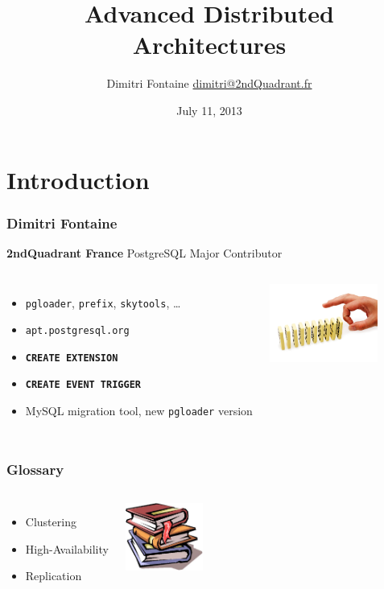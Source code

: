 \documentclass{beamer}
\title{Advanced Distributed Architectures}
\author{Dimitri Fontaine \url{dimitri@2ndQuadrant.fr}}
\date{July 11, 2013}
\begin{document}
\frame{\titlepage}

\section{Introduction}

\begin{frame}[fragile]
  \frametitle{Dimitri Fontaine}

  \begin{center}
    \textbf{2ndQuadrant France}
    \linebreak
    PostgreSQL Major Contributor
  \end{center}
  \vfill

\begin{columns}[c]

  \begin{itemize}
   \item<1-> \texttt{pgloader}, \texttt{prefix}, \texttt{skytools}, …
   \item<1-> \texttt{apt.postgresql.org}
   \item<2-> \texttt{\textbf{CREATE EXTENSION}}
   \item<2-> \texttt{\textbf{CREATE EVENT TRIGGER}}
   \item<3-> MySQL migration tool, new \texttt{pgloader} version
  \end{itemize}  

\begin{center}
  \includegraphics[height=7em]{event-trigger.jpg}
\end{center}
\end{columns}
\end{frame}

\begin{frame}
  \frametitle{Glossary}
  
  \vfill

\begin{columns}[c]

  \begin{itemize}
    \item \alert{C}lustering
    \item \alert{H}igh-\alert{A}vailability 
    \item \alert{R}eplication
  \end{itemize}  

\includegraphics[height=6em]{glossaire.jpg}
\end{columns}
\end{frame}
\end{document}
